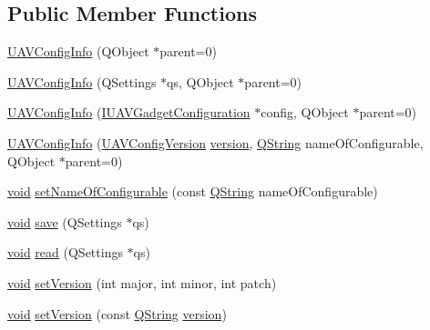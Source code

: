 \subsection*{\-Public \-Member \-Functions}
\begin{DoxyCompactItemize}
\item 
\hyperlink{group___core_plugin_gacf5020eb455875fe2ce543b2e8d24315}{\-U\-A\-V\-Config\-Info} (\-Q\-Object $\ast$parent=0)
\item 
\hyperlink{group___core_plugin_ga933409bece83e4aed5c3efac0079f7c4}{\-U\-A\-V\-Config\-Info} (\-Q\-Settings $\ast$qs, \-Q\-Object $\ast$parent=0)
\item 
\hyperlink{group___core_plugin_ga293738c41bbf0024336c21246611d365}{\-U\-A\-V\-Config\-Info} (\hyperlink{class_core_1_1_i_u_a_v_gadget_configuration}{\-I\-U\-A\-V\-Gadget\-Configuration} $\ast$config, \-Q\-Object $\ast$parent=0)
\item 
\hyperlink{group___core_plugin_ga877152eb896ac34a5ad81d03fe104712}{\-U\-A\-V\-Config\-Info} (\hyperlink{class_core_1_1_u_a_v_config_version}{\-U\-A\-V\-Config\-Version} \hyperlink{group___core_plugin_ga445d72afa775caf72f6d61884a36e7aa}{version}, \hyperlink{group___u_a_v_objects_plugin_gab9d252f49c333c94a72f97ce3105a32d}{\-Q\-String} name\-Of\-Configurable, \-Q\-Object $\ast$parent=0)
\item 
\hyperlink{group___u_a_v_objects_plugin_ga444cf2ff3f0ecbe028adce838d373f5c}{void} \hyperlink{group___core_plugin_ga448ae0ec57eeaf4fafc1323489437506}{set\-Name\-Of\-Configurable} (const \hyperlink{group___u_a_v_objects_plugin_gab9d252f49c333c94a72f97ce3105a32d}{\-Q\-String} name\-Of\-Configurable)
\item 
\hyperlink{group___u_a_v_objects_plugin_ga444cf2ff3f0ecbe028adce838d373f5c}{void} \hyperlink{group___core_plugin_ga285242175c9cff69e9370fa285744b28}{save} (\-Q\-Settings $\ast$qs)
\item 
\hyperlink{group___u_a_v_objects_plugin_ga444cf2ff3f0ecbe028adce838d373f5c}{void} \hyperlink{group___core_plugin_ga62813f8316e5bdf825f049c85e1d210d}{read} (\-Q\-Settings $\ast$qs)
\item 
\hyperlink{group___u_a_v_objects_plugin_ga444cf2ff3f0ecbe028adce838d373f5c}{void} \hyperlink{group___core_plugin_ga3ea89d37d0ba1f4c972006e6b761c922}{set\-Version} (int major, int minor, int patch)
\item 
\hyperlink{group___u_a_v_objects_plugin_ga444cf2ff3f0ecbe028adce838d373f5c}{void} \hyperlink{group___core_plugin_gabca8cfe88b7b3320fb60709744be4822}{set\-Version} (const \hyperlink{group___u_a_v_objects_plugin_gab9d252f49c333c94a72f97ce3105a32d}{\-Q\-String} \hyperlink{group___core_plugin_ga445d72afa775caf72f6d61884a36e7aa}{version})

\end{DoxyCompactItemize}
